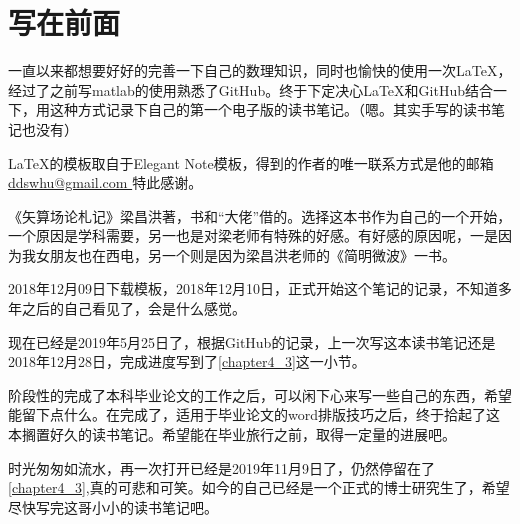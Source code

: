 	\chapter*{写在前面}
	
一直以来都想要好好的完善一下自己的数理知识，同时也愉快的使用一次\LaTeX，经过了之前写matlab的使用熟悉了GitHub。终于下定决心\LaTeX 和GitHub结合一下，用这种方式记录下自己的第一个电子版的读书笔记。（嗯。其实手写的读书笔记也没有）
	
\LaTeX 的模板取自于Elegant Note模板，得到的作者的唯一联系方式是他的邮箱 \url{ddswhu@gmail.com }特此感谢。

《矢算场论札记》梁昌洪著，书和“大佬”借的。选择这本书作为自己的一个开始，一个原因是学科需要，另一也是对梁老师有特殊的好感。有好感的原因呢，一是因为我女朋友也在西电，另一个则是因为梁昌洪老师的《简明微波》一书。
	
2018年12月09日下载模板，2018年12月10日，正式开始这个笔记的记录，不知道多年之后的自己看见了，会是什么感觉。
	
现在已经是2019年5月25日了，根据GitHub的记录，上一次写这本读书笔记还是2018年12月28日，完成进度写到了\ref{chapter4_3}这一小节。

阶段性的完成了本科毕业论文的工作之后，可以闲下心来写一些自己的东西，希望能留下点什么。在完成了，适用于毕业论文的word排版技巧之后，终于拾起了这本搁置好久的读书笔记。希望能在毕业旅行之前，取得一定量的进展吧。

时光匆匆如流水，再一次打开已经是2019年11月9日了，仍然停留在了\ref{chapter4_3},真的可悲和可笑。如今的自己已经是一个正式的博士研究生了，希望尽快写完这哥小小的读书笔记吧。

	